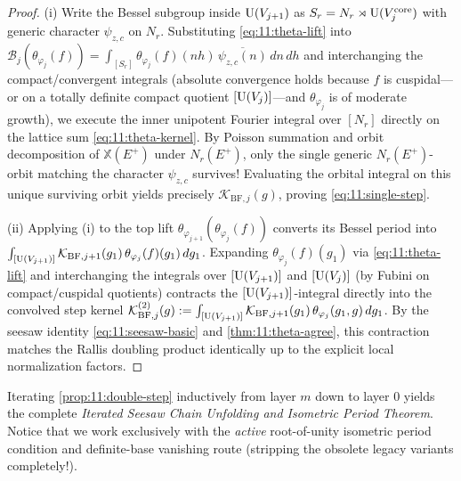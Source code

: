 \begin{proof}
(i) Write the Bessel subgroup inside $\mathrm{U}(V_{j+1})$ as $S_r = N_r \rtimes \mathrm{U}(V_j^{\mathrm{core}})$ with generic character $\psi_{z, c}$ on $N_r$. Substituting \eqref{eq:11:theta-lift} into $\mathcal{B}_j(\theta_{\varphi_j}(f)) = \int_{[S_r]} \theta_{\varphi_j}(f)(n h)\,\overline{\psi_{z,c}(n)}\, dn\, dh$ and interchanging the compact/convergent integrals (absolute convergence holds because $f$ is cuspidal—or on a totally definite compact quotient $[\mathrm{U}(V_j)]$—and $\theta_{\varphi_j}$ is of moderate growth), we execute the inner unipotent Fourier integral over $[N_r]$ directly on the lattice sum \eqref{eq:11:theta-kernel}. By Poisson summation and orbit decomposition of $\mathbb{X}(E^+)$ under $N_r(E^+)$, only the single generic $N_r(E^+)$-orbit matching the character $\psi_{z, c}$ survives! Evaluating the orbital integral on this unique surviving orbit yields precisely $\mathcal{K}_{\mathrm{BF}, j}(g)$, proving \eqref{eq:11:single-step}.

(ii) Applying (i) to the top lift $\theta_{\varphi_{j+1}}(\theta_{\varphi_j}(f))$ converts its Bessel period into $\int_{[\mathrm{U}(V_{j+1})]} \mathcal{K}_{\mathrm{BF}, j+1}(g_1)\,\theta_{\varphi_j}(f)(g_1)\, dg_1$. Expanding $\theta_{\varphi_j}(f)(g_1)$ via \eqref{eq:11:theta-lift} and interchanging the integrals over $[\mathrm{U}(V_{j+1})]$ and $[\mathrm{U}(V_j)]$ (by Fubini on compact/cuspidal quotients) contracts the $[\mathrm{U}(V_{j+1})]$-integral directly into the convolved step kernel $\mathcal{K}_{\mathrm{BF}, j}^{(2)}(g) := \int_{[\mathrm{U}(V_{j+1})]} \mathcal{K}_{\mathrm{BF}, j+1}(g_1)\,\theta_{\varphi_j}(g_1, g)\, dg_1$. By the seesaw identity \eqref{eq:11:seesaw-basic} and \cref{thm:11:theta-agree}, this contraction matches the Rallis doubling product identically up to the explicit local normalization factors.
\end{proof}

Iterating \cref{prop:11:double-step} inductively from layer $m$ down to layer $0$ yields the complete \emph{Iterated Seesaw Chain Unfolding and Isometric Period Theorem}. Notice that we work exclusively with the \emph{active} root-of-unity isometric period condition and definite-base vanishing route (stripping the obsolete legacy variants completely!).

